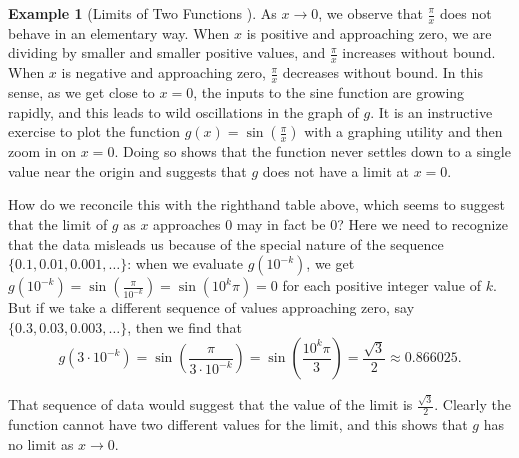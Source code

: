 \documentclass[10pt,]{book}
\theoremstyle{plain}
\theoremstyle{definition}
\theoremstyle{definition}
\theoremstyle{definition}
\newtheorem{example}[theorem]{Example}
\theoremstyle{definition}
\theoremstyle{definition}
\numberwithin{equation}{section}
\begin{document}
\begin{example}[Limits of Two Functions
  ]
    As \(x \to 0\), we observe that \(\frac{\pi}{x}\) does not behave in an elementary way. When \(x\) is positive and approaching zero, we are dividing by smaller and smaller positive values, and \(\frac{\pi}{x}\) increases without bound. When \(x\) is negative and approaching zero, \(\frac{\pi}{x}\) decreases without bound. In this sense, as we get close to \(x = 0\), the inputs to the sine function are growing rapidly, and this leads to wild oscillations in the graph of \(g\). It is an instructive exercise to plot the function \(g(x) = \sin\left(\frac{\pi}{x}\right)\) with a graphing utility and then zoom in on \(x = 0\). Doing so shows that the function never settles down to a single value near the origin and suggests that \(g\) does not have a limit at \(x = 0\).
\par

    How do we reconcile this with the righthand table above, which seems to suggest that the limit of \(g\) as \(x\) approaches \(0\) may in fact be \(0\)? Here we need to recognize that the data misleads us because of the special nature of the sequence \(\{0.1, 0.01, 0.001, \ldots\}\): when we evaluate \(g(10^{-k})\), we get \(g(10^{-k}) = \sin\left(\frac{\pi}{10^{-k}}\right) = \sin(10^k \pi) = 0\) for each positive integer value of \(k\). But if we take a different sequence of values approaching zero, say \(\{0.3, 0.03, 0.003, \ldots\}\), then we find that
\begin{equation*}
    g(3 \cdot 10^{-k}) = \sin\left(\frac{\pi}{3 \cdot 10^{-k}}\right) = \sin\left(\frac{10^k \pi}{3}\right) = \frac{\sqrt{3}}{2} \approx 0.866025.
    \end{equation*}\par

    That sequence of data would suggest that the value of the limit is \(\frac{\sqrt{3}}{2}\). Clearly the function cannot have two different values for the limit, and this shows that \(g\) has no limit as \(x \to 0\).
\end{example}
\par
\end{document}
